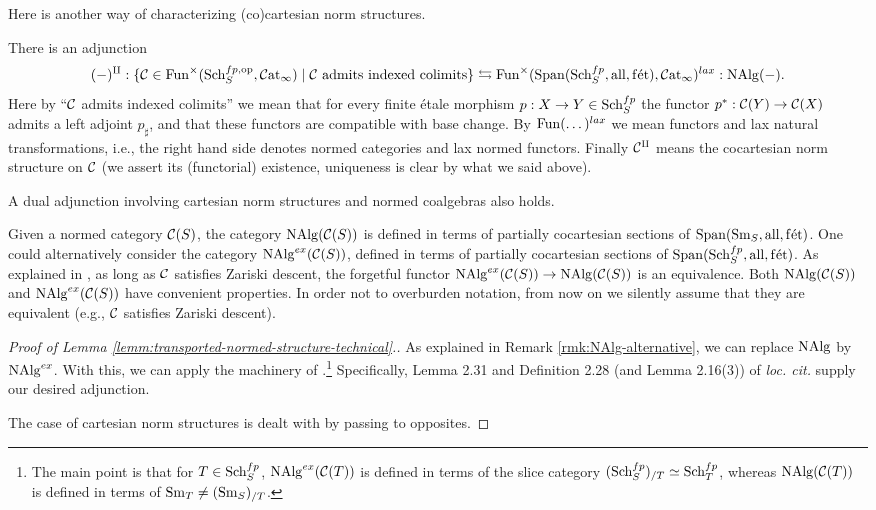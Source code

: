 \documentclass{amsart}
\renewcommand{\todo}[1]{}
\numberwithin{proposition}{section}
\numberwithin{equation}{section}
\def\fet{\mathrm{f\acute et}}
\def\all{\mathrm{all}}
\begin{document}
Here is another way of characterizing (co)cartesian norm structures.
\begin{lemma} \label{lemm:transported-normed-structure-technical}
There is an adjunction \[ (\ph)^{\amalg}: \{ \scr C \in \Fun^\times(\Sch_S^{fp,\op}, \Cat_\infty) \mid \scr C \text{ admits indexed colimits} \} \adj \Fun^{\times}(\Span(\Sch_S^{fp}, \all, \fet), \Cat_\infty)^{lax}: \NAlg(\ph). \]
Here by ``$\mathcal C$ admits indexed colimits'' we mean that for every finite étale morphism $p: X \to Y \in \mathrm{S}\mathrm{ch}{}_S^{fp}$ the functor $p^*: \mathcal C(Y) \to \mathcal C(X)$ admits a left adjoint $p_\sharp$, and that these functors are compatible with base change.
By $\mathrm{Fun}(\dots)^{lax}$ we mean functors and lax natural transformations, i.e., the right hand side denotes normed categories and lax normed functors.
Finally $\mathcal C^\amalg$ means the cocartesian norm structure on $\mathcal C$ (we assert its (functorial) existence, uniqueness is clear by what we said above).

A dual adjunction involving cartesian norm structures and normed coalgebras also holds.
\end{lemma}
\begin{remark} \label{rmk:NAlg-alternative}
Given a normed category $\mathcal C(S)$, the category $\mathrm{NAlg}(\mathcal C(S))$ is defined in terms of partially cocartesian sections of $\Span(\Sm_S, \all, \fet)$.
One could alternatively consider the category $\mathrm{NAlg}^{ex}(\mathcal C(S))$, defined in terms of partially cocartesian sections of $\Span(\Sch_S^{fp}, \all, \fet)$.
As explained in \cite[\S B]{bachmann-splitting}, as long as $\mathcal C$ satisfies Zariski descent, the forgetful functor $\mathrm{NAlg}^{ex}(\mathcal C(S)) \to \mathrm{NAlg}(\mathcal C(S))$ is an equivalence.
Both $\mathrm{NAlg}(\mathcal C(S))$ and $\mathrm{NAlg}^{ex}(\mathcal C(S))$ have convenient properties.
In order not to overburden notation, from now on we silently\todo{is this a good idea?} assume that they are equivalent (e.g., $\mathcal C$ satisfies Zariski descent).
\end{remark}
\begin{proof}[Proof of Lemma \ref{lemm:transported-normed-structure-technical}.]
As explained in Remark \ref{rmk:NAlg-alternative}, we can replace $\mathrm{NAlg}$ by $\mathrm{NAlg}^{ex}$.
With this, we can apply the machinery of \cite{LLP}.\footnote{The main point is that for $T \in \mathrm{S}\mathrm{ch}{}_S^{fp}$, $\mathrm{NAlg}^{ex}(\mathcal C(T))$ is defined in terms of the slice category $(\mathrm{S}\mathrm{ch}{}_{S}^{fp})_{/T} \simeq \mathrm{S}\mathrm{ch}{}_T^{fp}$, whereas $\mathrm{NAlg}(\mathcal C(T))$ is defined in terms of ${\mathrm{S}\mathrm{m}}_T \ne ({\mathrm{S}\mathrm{m}}_S)_{/T}$.}
Specifically, Lemma 2.31 and Definition 2.28 (and Lemma 2.16(3)) of \emph{loc. cit.} supply our desired adjunction.

The case of cartesian norm structures is dealt with by passing to opposites.
\end{proof}
\end{document}
